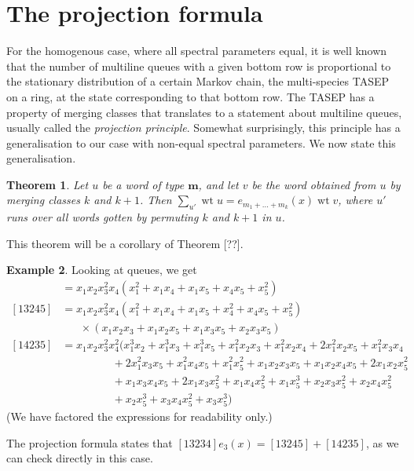 \documentclass[submission]{FPSAC2018}
\newcommand{\0}{\phantom{c}}
\DeclareMathOperator{\wt}{wt} %
\newcommand{\mm}{\mathbf{m}}
\let\sumnonlimits\sum
\renewcommand{\sum}{\sumnonlimits\limits}
\theoremstyle{plain}
\newtheorem{thm}{Theorem}[section]
\theoremstyle{definition}
\newtheorem{example}[thm]{Example}
\numberwithin{equation}{section}
\begin{document}
\section{The projection formula}

For the homogenous case, where all spectral parameters equal, it is well known that the number of multiline queues with a given bottom row is proportional to the stationary distribution of a certain Markov chain, the multi-species TASEP on a ring, at the state corresponding to that bottom row. The TASEP has a property of merging classes that translates to a statement about multiline queues, usually called the {\it projection principle}. Somewhat surprisingly, this principle has a generalisation to our case with non-equal spectral parameters. We now state this generalisation.

\begin{thm}
  Let $u$ be a word of type $\mm$, and let $v$ be the word obtained from $u$ by merging classes $k$ and $k+1$.
  Then $\sum_{u'} \wt{u} = e_{m_1+\dots+m_k}(x) \wt{v}$,
  where $u'$ runs over all words gotten by permuting $k$ and $k+1$ in $u$.
\end{thm}

This theorem will be a corollary of Theorem [??].


\begin{example}
Looking at queues, we get
\begin{align*}
[13234] & = x_1 x_2 x_3^2 x_4 (x_1^2 + x_1 x_4 + x_1 x_5 + x_4 x_5 + x_5^2)
\\ [13245] & = x_1 x_2 x_3^2 x_4 (x_1^2 + x_1x_4 + x_1x_5 + x_4^2 + x_4x_5 + x_5^2)
\\ & \hspace{20pt} \times (x_1x_2x_3 + x_1x_2x_5+x_1x_3x_5+x_2x_3x_5)
\\ [14235] & = x_1x_2x_3^2x_4^2 (x_1^3x_2 + x_1^3x_3 + x_1^3x_5 + x_1^2x_2x_3 + x_1^2x_2x_4 + 2x_1^2x_2x_5 + x_1^2x_3x_4
\\ & \hspace{55pt} + 2x_1^2x_3x_5 + x_1^2x_4x_5 + x_1^2x_5^2 + x_1x_2x_3x_5 + x_1x_2x_4x_5 + 2x_1x_2x_5^2
\\ & \hspace{55pt} + x_1x_3x_4x_5 + 2x_1x_3x_5^2 + x_1x_4x_5^2 + x_1x_5^3 + x_2x_3x_5^2 + x_2x_4x_5^2
\\ & \hspace{55pt} + x_2x_5^3 + x_3x_4x_5^2 + x_3x_5^3)
\end{align*}
(We have factored the expressions for readability only.)

The projection formula states that $[13234] e_3(x) = [13245] + [14235]$, as we can check directly in this case.
\end{example}
\end{document}
